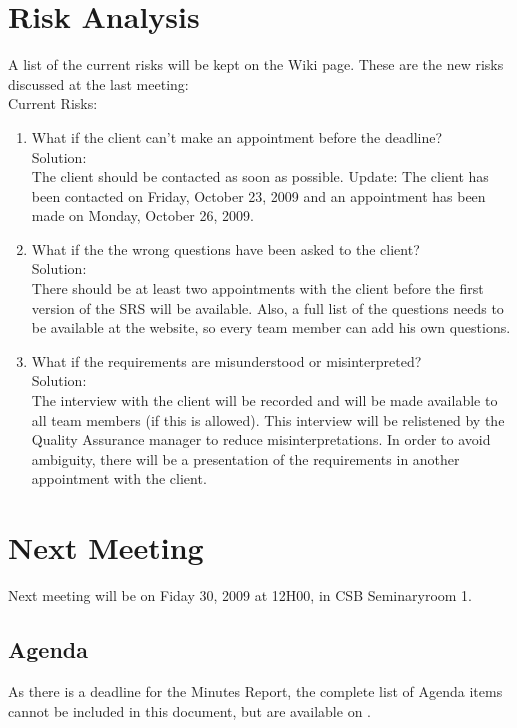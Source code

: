 \documentclass[a4paper, 12pt]{article}
\begin{document}
	\section{Risk Analysis}
A list of the current risks will be kept on the Wiki page. These are the new risks discussed at the last meeting:\\
	Current Risks:
		\begin{enumerate}
		\item What if the client can't make an appointment before the deadline? \\
		Solution:\\
The client should be contacted as soon as possible. Update: The client has been contacted on Friday, October 23, 2009 and an appointment has been made on Monday, October 26, 2009.
		\item What if the the wrong questions have been asked to the client?\\
		Solution:\\
There should be at least two appointments with the client before the first version of the SRS will be available. Also, a full list of the questions\cite{site3} needs to be available at the website, so every team member can add his own questions.
		\item What if the requirements are misunderstood or misinterpreted?\\
		Solution:\\
The interview with the client will be recorded and will be made available to all team members (if this is allowed). This interview will be relistened by the Quality Assurance manager to reduce misinterpretations. In order to avoid ambiguity, there will be a presentation of the requirements in another appointment with the client.
		\end{enumerate}



	\section{Next Meeting}
	
	Next meeting will be on Fiday 30, 2009 at 12H00, in CSB Seminaryroom 1. 
	
	
	\subsection{Agenda}
	As there is a deadline for the Minutes Report, the complete list of Agenda items cannot be included in this document, but are available on \cite{site4}.
\end{document}
